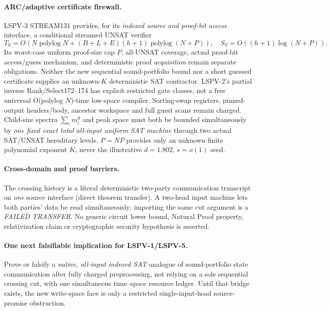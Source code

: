 \documentclass[11pt]{article}
\begin{document}
\paragraph{ARC/adaptive certificate firewall.}
LSPV-3 STREAM131 provides, for its \emph{indexed source
and proof-bit access} interface, a conditional streamed
UNSAT verifier
\[
T_V=O(N\operatorname{polylog}N+
(B+L+E)(h+1)\operatorname{polylog}(N+P)),\quad
S_V=O((h+1)\log(N+P)).
\]
Its worst-case uniform proof-size cap $P$, all-UNSAT
coverage, actual proof-bit access/guess mechanism,
and deterministic proof \emph{acquisition} remain
separate obligations. Neither the new sequential
sound-portfolio bound nor a short guessed certificate
supplies an unknown-$K$ deterministic SAT contractor.
LSPV-2's partial inverse Rank/Select172--174 has
explicit restricted gate classes, not a free universal
O(polylog $N$)-time low-space compiler. Sorting-swap
registers, pinned-output headers/body, ancestor
workspace and full guest scans remain charged.
Child-size spectra $\sum_i m_i^d$ and peak space must
both be bounded simultaneously by \emph{one fixed
exact total all-input uniform SAT machine} through
two actual SAT/UNSAT hereditary levels. $P=NP$
provides only an unknown finite polynomial exponent
$K$, never the illustrative $d=1.802$, $s=o(1)$ seed.

\paragraph{Cross-domain and proof barriers.}
The crossing history is a literal deterministic
two-party communication transcript on \emph{one}
source interface (direct theorem transfer). A two-head
input machine lets both parties' data be read
simultaneously; importing the same cut argument is a
\emph{FAILED TRANSFER}. No generic circuit
lower bound, Natural Proof property, relativization
claim or cryptographic security hypothesis is asserted.

\paragraph{One next falsifiable implication for LSPV-1/LSPV-5.}
Prove or falsify a \emph{native, all-input indexed SAT}
analogue of sound-portfolio state communication after
fully charged preprocessing, not relying on a sole
sequential crossing cut, with one simultaneous
time--space resource ledger. Until that bridge exists,
the new write-space face is only a restricted
single-input-head source-promise obstruction.
\end{document}
